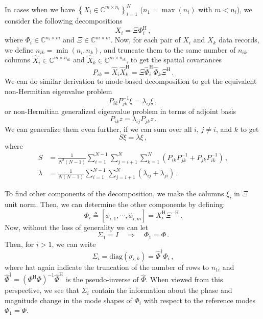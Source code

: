 \documentclass[10pt]{article}
\begin{document}
In cases when we have $\left\{X_i\in\mathbb{C}^{m\times n_i}\right\}_{i=1}^N$ ($n_1 = \max(n_i)$ with $m<n_i$), we consider the following decompositions
\begin{equation}
    X_i = \Xi \Phi_i^\mathrm{H}\,,
\end{equation}
where $\Phi_i\in\mathbb{C}^{n_i\times m}$ and $\Xi\in\mathbb{C}^{m\times m}$.
Now, for each pair of $X_i$ and $X_k$ data records, we define $n_{ik} = \min\left(n_i,n_k\right)$, and truncate them to the same number of $n_{ik}$ columns $\hat X_i \in \mathbb{C}^{m\times n_{ik}}$ and $\hat X_k \in \mathbb{C}^{m\times n_{ik}}$, to get the spatial covariances
\begin{equation}
    P_{ik} = \hat X_i \hat X_k^\mathrm{H} = \Xi \hat \Phi_i^\mathrm{H} \hat \Phi_k \Xi^\mathrm{H}\,.
\end{equation}
We can do similar derivation to mode-based decomposition to get the equivalent non-Hermitian eigenvalue problem
\begin{equation}
     P_{ik} P_{jk}^{-1}  \xi = \lambda_{ij} \xi \,,
\end{equation}
or non-Hermitian generalized eigenvalue problem in terms of adjoint basis
\begin{equation}
    P_{ik} z = \lambda_{ij} P_{jk} z \,.    
\end{equation}
We can generalize them even further, if we can sum over all $i$, $j\ne i$, and $k$ to get
\begin{equation}
     S \xi = \lambda \xi \,,
\end{equation}
where
\begin{equation}
\begin{aligned}
    S & = \frac{1}{N^2(N-1)}\sum_{i=1}^{N-1} \sum_{j=i+1}^N\sum_{k=1}^N \left(P_{ik}P_{jk}^{-1} + P_{jk}P_{ik}^{-1}\right)\,,\\
    \lambda & = \frac{1}{N(N-1)}\sum_{i=1}^{N-1} \sum_{j=i+1}^N \left(\lambda_{ij}+\lambda_{ji}\right)\,.
\end{aligned}    
\end{equation}

To find other components of the decomposition, we make the columns $\xi_i$ in $\Xi$ unit norm.
Then, we can determine the other components by defining:
\begin{equation}\label{Meq}
    \Phi_i\triangleq\left[\phi_{i,1}, \cdots, \phi_{i,m} \right] = X_i^{\mathrm{H}}\Xi^{-\mathrm{H}}  \,.
\end{equation}
Now, without the loss of generality we can let
\begin{equation}
    \Sigma_1 = I \quad \Rightarrow \quad \Phi_1 = \Phi\,.
\end{equation}
Then, for $i>1$, we can write 
\begin{equation}
    \Sigma_i = \mathrm{diag}(\sigma_{i,k})
    = \hat \Phi^\dag \hat \Phi_i\,,
\end{equation}
where hat again indicate the truncation of the number of rows to $n_{1i}$ and $\hat \Phi^\dag = (\Phi^\mathrm{H} \Phi)^{-1}\hat \Phi^\mathrm{H}$ is the pseudo-inverse of $\hat \Phi$.
When viewed from this perspective, we see that $\Sigma_i$ contain the information about the phase and magnitude change in the mode shapes of $\Phi_i$ with respect to the reference modes $\Phi_1=\Phi$.
\end{document}
